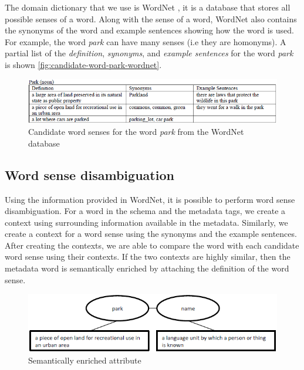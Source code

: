 The domain dictionary that we use is WordNet \cite{Fellbaum1998Computers}, it is a database that stores all possible senses of a word. Along with the sense of a word, WordNet also contains the synonyms of the word and example sentences showing how the word is used. For example, the word \textit{park} can have many senses (i.e they are homonyms). A partial list of the \textit{definition}, \textit{synonyms}, and \textit{example sentences} for the word \textit{park} is shown \autoref{fig:candidate-word-park-wordnet}.

\begin{figure}
    \centering
    \includegraphics[width=5in]{figures/candidate-word-park-wordnet.png}
    \caption{Candidate word senses for the word \textit{park} from the WordNet database}
    \label{fig:candidate-word-park-wordnet}
\end{figure}

\subsection{Word sense disambiguation}

Using the information provided in WordNet, it is possible to perform word sense disambiguation. For a word in the schema and the metadata tags, we create a context using surrounding information available in the metadata. Similarly, we create a context for a word sense using the synonyms and the example sentences. After creating the contexts, we are able to compare the word with each candidate word sense using their contexts. If the two contexts are highly similar, then the metadata word is semantically enriched by attaching the definition of the word sense. 

\begin{figure}
    \centering
    \includegraphics[width=5in]{figures/semantically-enriched-attribute.png}
    \caption{Semantically enriched attribute}
    \label{fig:semantically-enriched-attribute}
\end{figure}

